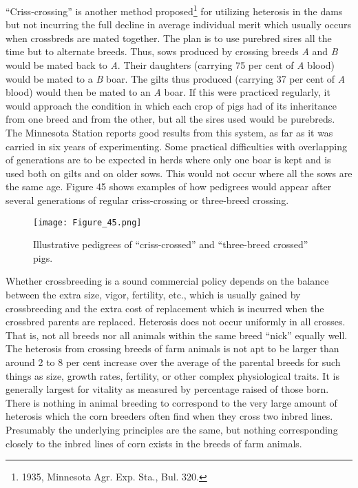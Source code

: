 ``Criss-crossing'' is another method proposed\footnote{1935, Minnesota Agr.
Exp. Sta., Bul. 320.} for utilizing heterosis in the dams but not incurring
the full decline in average individual merit which usually occurs when
crossbreds are mated together. The plan is to use purebred sires all the time
but to alternate breeds. Thus, sows produced by crossing breeds \textit{A}
and \textit{B} would be mated back to \textit{A}. Their daughters (carrying
75 per cent of \textit{A} blood) would be mated to a \textit{B} boar. The
gilts thus produced (carrying 37 per cent of \textit{A} blood)
would then be mated to an \textit{A} boar. If this were practiced regularly,
it would approach the condition in which each crop of pigs had 
of its inheritance from one breed and  from the other, but all
the sires used would be purebreds. The Minnesota Station reports good results
from this system, as far as it was carried in six years of experimenting. Some
practical difficulties with overlapping of generations are to be expected in
herds where only one boar is kept and is used both on gilts and on older sows.
This would not occur where all the sows are the same age. Figure 45 shows
examples of how pedigrees would appear after several generations of regular
criss-crossing or three-breed crossing.

\begin{figure}
	\centering
    \texttt{[image: Figure\_45.png]}
    \caption{Illustrative pedigrees of ``criss-crossed'' and ``three-breed crossed'' pigs.}
    \label{fig:Lush_Figure_45}
\end{figure}

Whether crossbreeding is a sound commercial policy depends on
the balance between the extra size, vigor, fertility, etc., which is usually
gained by crossbreeding and the extra cost of replacement which is
incurred when the crossbred parents are replaced. Heterosis does not
occur uniformly in all crosses. That is, not all breeds nor all animals
within the same breed ``nick'' equally well. The heterosis from crossing
breeds of farm animals is not apt to be larger than around 2 to 8 per
cent increase over the average of the parental breeds for such things as
size, growth rates, fertility, or other complex physiological traits. It is
generally largest for vitality as measured by percentage raised of those
born. There is nothing in animal breeding to correspond to the very
large amount of heterosis which the corn breeders often find when they
cross two inbred lines. Presumably the underlying principles are the
same, but nothing corresponding closely to the inbred lines of corn
exists in the breeds of farm animals.

